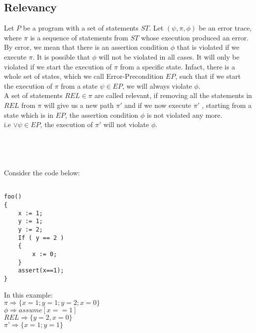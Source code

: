 \documentclass{article}
\begin{document}
\subsection{Relevancy}
Let $P$ be a program with a set of statements $ST$. Let $(\psi, \pi , \phi)$ be an error trace, where $\pi$ is a sequence of statements from $ST$ whose execution produced an error. By error, we mean that there is an assertion condition $\phi$ that is violated if we execute $\pi$. It is possible that $\phi$ will not be violated in all cases. It will only be violated if we start the execution of $\pi$ from a specific state. Infact, there is a whole set of states, which we call Error-Precondition $EP$, such that if we start the execution of $\pi$ from a state $\psi \in  EP$, we will always violate $\phi$.\\
A set of statements $REL \in \pi$ are called relevant, if removing all the statements in $REL$ from $\pi$ will give us a new path $\pi'$ and if we now execute $\pi'$ , starting from a state which is in $EP$, the assertion condition $\phi$ is not violated any more.
\\
i.e $ \vee  \psi \in EP$, the execution of  $\pi'$  will not violate $\phi$.
\\
\\
\\
\\
\\
Consider the code below:
\begin{lstlisting}

foo()
{
	x := 1;
	y := 1;
	y := 2;
	If ( y == 2 )
	{
		x := 0;
	}
	assert(x==1);
}

\end{lstlisting}
In this example: \\
$\pi \Rightarrow \{ x=1; y=1; y=2; x=0 \} $\\
$\phi \Rightarrow assume[x==1]$\\
$REL \Rightarrow \{y=2, x=0 \}$ \\
$\pi’ \Rightarrow \{x=1; y=1\}$
\end{document}
